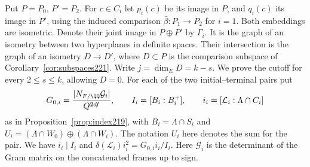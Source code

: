 \documentclass[a4paper,11pt]{article}
\theoremstyle{definition}
\theoremstyle{remark}
\numberwithin{equation}{section}
\begin{document}
Put \(P=P_0\), \(P'=P_2\). For \(c\in C_i\) let \(p_i(c)\)
be its image in \(P\), and \(q_i(c)\) its image in \(P'\),
using the induced comparison \(\bar\beta:P_1\to P_2\) for
\(i=1\). Both embeddings are isometric. Denote their joint
image in \(P\oplus P'\) by \(\Gamma_i\). It is the graph of
an isometry between two hyperplanes in definite spaces.
Their intersection is the graph of an isometry
\(D\to D'\), where \(D\subset P\) is the comparison subspace
of Corollary~\ref{cor:subspaces221}. Write \(j=\dim_E D=k-s\).
We prove the cutoff for every \(2\le s\le k\), allowing
\(D=0\). For each of the two initial--terminal pairs put
\[
     G_{0,i}=\frac{|N_{F/\QQ}\mathcal G_i|}{Q^{2df}},\qquad
     I_i=[B_i:B_i^+],\qquad i_i=[\mathcal L_i:\Lambda\cap C_i]
\]
as in Proposition~\ref{prop:index219}, with \(B_i=\Lambda\cap S_i\)
and \(U_i=(\Lambda\cap W_0)\oplus(\Lambda\cap W_i)\).
The notation \(U_i\) here denotes the sum for the pair.
We have \(i_i\mid I_i\) and
\(\delta(\mathcal L_i)i_i^2=G_{0,i} i_i/I_i\). Here
\(\mathcal G_i\) is the determinant of the Gram matrix on
the concatenated frames up to sign.
\end{document}
